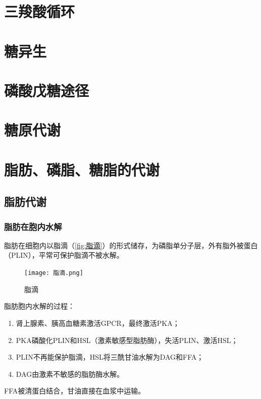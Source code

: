 \section{三羧酸循环}

\section{糖异生}

\section{磷酸戊糖途径}

\section{糖原代谢}

\section{脂肪、磷脂、糖脂的代谢}

\subsection{脂肪代谢}

\subsubsection{脂肪在胞内水解}

脂肪在细胞内以脂滴（\autoref{fig:脂滴}）的形式储存，为磷脂单分子层，外有脂外被蛋白（PLIN），平常可保护脂滴不被水解。

\begin{figure}[htbp]
	\centering
	\texttt{[image: 脂滴.png]}
	\caption{脂滴}
	\label{fig:脂滴}
\end{figure}

脂肪胞内水解的过程：

\begin{enumerate}
	\item 肾上腺素、胰高血糖素激活GPCR，最终激活PKA；
	\item PKA磷酸化PLIN和HSL（激素敏感型脂肪酶），失活PLIN、激活HSL；
	\item PLIN不再能保护脂滴，HSL将三酰甘油水解为DAG和FFA；
	\item DAG由激素不敏感的脂肪酶水解。
\end{enumerate}

FFA被清蛋白结合，甘油直接在血浆中运输。

